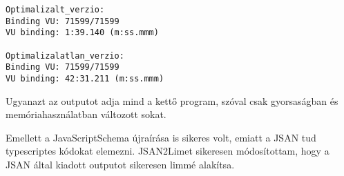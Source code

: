 
\begin{lstlisting}[caption={JSAN lefutási idő előtte és utána}, label={lst:jsan_before_after_comparison}]
Optimalizalt_verzio:
Binding VU: 71599/71599
VU binding: 1:39.140 (m:ss.mmm)

Optimalizalatlan_verzio:
Binding VU: 71599/71599
VU binding: 42:31.211 (m:ss.mmm)
\end{lstlisting}

Ugyanazt az outputot adja mind a kettő program, szóval csak gyorsaságban és memóriahasználatban változott sokat.

Emellett a JavaScriptSchema újraírása is sikeres volt, emiatt a JSAN tud typescriptes kódokat elemezni.
JSAN2Limet sikeresen módosítottam, hogy a JSAN által kiadott outputot sikeresen limmé alakítsa.
